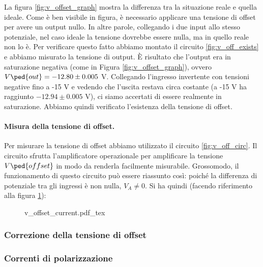 La figura \ref{fig:v_offset_graph} mostra la differenza tra la situazione reale e quella
ideale. Come è ben visibile in figura, è necessario applicare una tensione di offset per
avere un output nullo. In altre parole, collegando i due input allo stesso potenziale,
nel caso ideale la tensione dovrebbe essere nulla, ma in quello reale non lo è.
Per verificare questo fatto abbiamo montato il circuito \ref{fig:v_off_exists} e abbiamo misurato
la tensione di output. È risultato che l'output era in saturazione negativa (come in Figura \ref{fig:v_offset_graph}),
ovvero $V\ped{out} = -12.80 \pm 0.005$ V. Collegando l'ingresso invertente con tensioni negative fino a -15 V
e vedendo che l'uscita restava circa costante (a -15 V ha raggiunto $-12.94 \pm 0.005$ V),
ci siamo accertati di essere realmente in saturazione. Abbiamo quindi verificato l'esistenza
della tensione di offset.

\paragraph{Misura della tensione di offset.}

Per misurare la tensione di offset abbiamo utilizzato il circuito \ref{fig:v_off_circ}.
Il circuito sfrutta l'amplificatore operazionale per amplificare la tensione $V\ped{offset}$
in modo da renderla facilmente misurabile. Grossomodo, il funzionamento di questo circuito
può essere riassunto così: poiché la differenza di potenziale tra gli ingressi è non nulla, 
$V_A \neq 0$. Si ha quindi (facendo riferimento alla figura \ref{fig:circ_con_corr}):

\begin{figure}[t]
    \def\svgwidth{0.5\textwidth}
    {v_offset_current.pdf_tex}
    \caption{ }
    \label{fig:circ_con_corr}
\end{figure}

\subsubsection{Correzione della tensione di offset}

\subsubsection{Correnti di polarizzazione}
